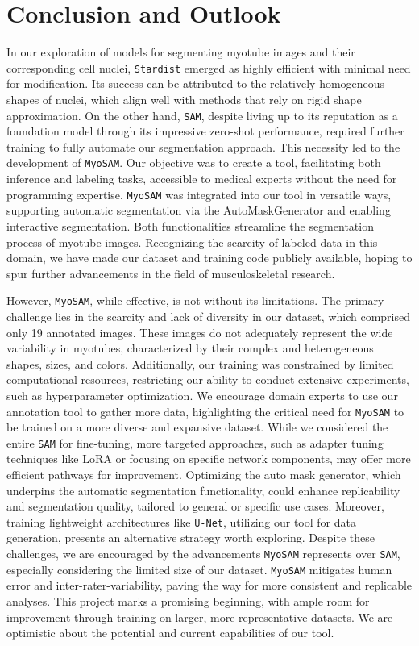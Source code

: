 \section{Conclusion and Outlook}
In our exploration of models for segmenting myotube images and their corresponding cell nuclei, \texttt{Stardist} emerged as highly efficient with minimal need for modification. Its success can be attributed to the relatively homogeneous shapes of nuclei, which align well with methods that rely on rigid shape approximation. On the other hand, \texttt{SAM}, despite living up to its reputation as a foundation model through its impressive zero-shot performance, required further training to fully automate our segmentation approach. This necessity led to the development of \texttt{MyoSAM}. Our objective was to create a tool, facilitating both inference and labeling tasks, accessible to medical experts without the need for programming expertise. \texttt{MyoSAM} was integrated into our tool in versatile ways, supporting automatic segmentation via the AutoMaskGenerator and enabling interactive segmentation. Both functionalities streamline the segmentation process of myotube images. Recognizing the scarcity of labeled data in this domain, we have made our dataset and training code publicly available, hoping to spur further advancements in the field of musculoskeletal research.

However, \texttt{MyoSAM}, while effective, is not without its limitations. The primary challenge lies in the scarcity and lack of diversity in our dataset, which comprised only 19 annotated images. These images do not adequately represent the wide variability in myotubes, characterized by their complex and heterogeneous shapes, sizes, and colors. Additionally, our training was constrained by limited computational resources, restricting our ability to conduct extensive experiments, such as hyperparameter optimization.
We encourage domain experts to use our annotation tool to gather more data, highlighting the critical need for \texttt{MyoSAM} to be trained on a more diverse and expansive dataset. While we considered the entire \texttt{SAM} for fine-tuning, more targeted approaches, such as adapter tuning techniques like LoRA or focusing on specific network components, may offer more efficient pathways for improvement. Optimizing the auto mask generator, which underpins the automatic segmentation functionality, could enhance replicability and segmentation quality, tailored to general or specific use cases. Moreover, training lightweight architectures like \texttt{U-Net}, utilizing our tool for data generation, presents an alternative strategy worth exploring.
Despite these challenges, we are encouraged by the advancements \texttt{MyoSAM} represents over \texttt{SAM}, especially considering the limited size of our dataset. \texttt{MyoSAM} mitigates human error and inter-rater-variability, paving the way for more consistent and replicable analyses. This project marks a promising beginning, with ample room for improvement through training on larger, more representative datasets. We are optimistic about the potential and current capabilities of our tool.
